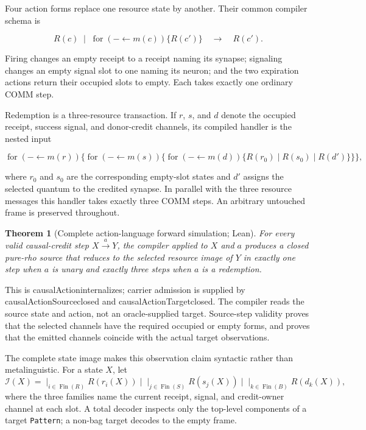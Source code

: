 \documentclass[11pt]{article}
\newtheorem{theorem}{Theorem}[section]
\newcommand{\Fin}{\operatorname{Fin}}
\newcommand{\code}[1]{\texttt{#1}}
\newcommand{\leanname}[1]{{\scriptsize\ttfamily
  \def\_{\textunderscore\allowbreak}#1}}
\begin{document}
Four action forms replace one resource state by another.  Their common
compiler schema is

\[
 R(c)\;\mid\;
 \operatorname{for}({-}\leftarrow m(c))\{R(c')\}
 \quad\longrightarrow\quad R(c').
\]

Firing changes an empty receipt to a receipt naming its synapse; signaling
changes an empty signal slot to one naming its neuron; and the two expiration
actions return their occupied slots to empty.  Each takes exactly one ordinary
COMM step.

Redemption is a three-resource transaction.  If $r$, $s$, and $d$ denote the
occupied receipt, success signal, and donor-credit channels, its compiled
handler is the nested input

\[
 \operatorname{for}({-}\leftarrow m(r))\{
 \operatorname{for}({-}\leftarrow m(s))\{
 \operatorname{for}({-}\leftarrow m(d))\{
   R(r_0)\mid R(s_0)\mid R(d')
 \}\}\},
\]

where $r_0$ and $s_0$ are the corresponding empty-slot states and $d'$ assigns
the selected quantum to the credited synapse.  In parallel with the three
resource messages this handler takes exactly three COMM steps.  An arbitrary
untouched frame is preserved throughout.

\begin{theorem}[Complete action-language forward simulation; Lean]
For every valid causal-credit step $X\xrightarrow{a}Y$, the compiler applied
to $X$ and $a$ produces a closed pure-rho source that reduces to the selected
resource image of $Y$ in exactly one step when $a$ is unary and exactly three
steps when $a$ is a redemption.
\end{theorem}

This is \leanname{causalAction\_internalizes}; carrier admission is supplied
by \leanname{causalActionSource\_closed} and
\leanname{causalActionTarget\_closed}.  The compiler reads the source state
and action, not an oracle-supplied target.  Source-step validity proves that
the selected channels have the required occupied or empty forms, and proves
that the emitted channels coincide with the actual target observations.

The complete state image makes this observation claim syntactic rather than
metalinguistic.  For a state $X$, let
\[
  \mathcal I(X)=
  \mathop{\mid}_{i\in\Fin(R)} R(r_i(X))
  \mid
  \mathop{\mid}_{j\in\Fin(S)} R(s_j(X))
  \mid
  \mathop{\mid}_{k\in\Fin(B)} R(d_k(X)),
\]
where the three families name the current receipt, signal, and credit-owner
channel at each slot.  A total decoder inspects only the top-level components
of a target \code{Pattern}; a non-bag target decodes to the empty frame.
\end{document}
